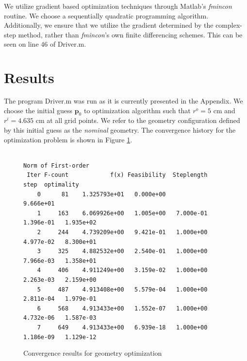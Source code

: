 \documentclass[11pt]{article}
\newcommand{\bs}[1] {\boldsymbol{#1}}
\begin{document}
We utilize gradient based optimization techniques through
Matlab's \emph{fmincon} routine. We choose a
sequentially quadratic programming algorithm.
Additionally, we ensure that we utilize the gradient
determined by the complex-step method, rather than
\emph{fmincon}'s own finite differencing schemes.
This can be seen on line $46$ of Driver.m.

\section{Results}

The program Driver.m was run as it is currently presented
in the Appendix. We choose the initial guess $\bs{p}_0$ to
optimization algorithm such that $r^o = 5$ cm and $r^i = 4.635$ cm
at all grid points. We refer to the geometry configuration defined
by this initial guess as the \emph{nominal} geometry.
The convergence history for the optimization
problem is shown in Figure \ref{fig:convergence}.

\begin{figure}[hbt]
\small
\centering
\begin{verbatim}
                                                         Norm of First-order
 Iter F-count            f(x) Feasibility  Steplength        step  optimality
    0      81    1.325793e+01   0.000e+00                           9.666e+01
    1     163    6.069926e+00   1.005e+00   7.000e-01   1.396e-01   1.935e+02
    2     244    4.739209e+00   9.421e-01   1.000e+00   4.977e-02   8.300e+01
    3     325    4.882532e+00   2.540e-01   1.000e+00   7.966e-03   1.358e+01
    4     406    4.911249e+00   3.159e-02   1.000e+00   2.263e-03   2.159e+00
    5     487    4.913408e+00   5.579e-04   1.000e+00   2.811e-04   1.979e-01
    6     568    4.913433e+00   1.552e-07   1.000e+00   4.732e-06   1.587e-03
    7     649    4.913433e+00   6.939e-18   1.000e+00   1.186e-09   1.129e-12
\end{verbatim}
\caption{Convergence results for geometry optimization}
\label{fig:convergence}
\end{figure}
\end{document}

